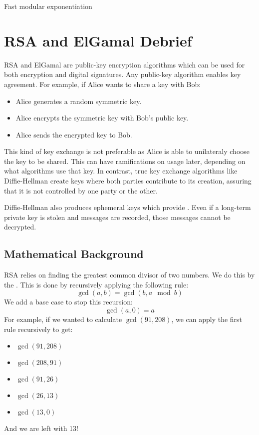 \begin{tecbox}{Fast modular exponentiation}{}
\end{tecbox}

\section{RSA and ElGamal Debrief}
RSA and ElGamal are public-key encryption algorithms which can be used for both encryption and digital signatures. Any public-key algorithm enables key agreement. For example, if Alice wants to share a key with Bob:
\begin{itemize}
    \item Alice generates a random symmetric key.
    \item Alice encrypts the symmetric key with Bob's public key.
    \item Alice sends the encrypted key to Bob.
\end{itemize}

This kind of key exchange is not preferable as Alice is able to unilateraly choose the key to be shared. This can have ramifications on usage later, depending on what algorithms use that key. In contrast, true key exchange algorithms like Diffie-Hellman create keys where both parties contribute to its creation, assuring that it is not controlled by one party or the other.

Diffie-Hellman also produces ephemeral keys which provide . Even if a long-term private key is stolen and messages are recorded, those messages cannot be decrypted.

\subsection{Mathematical Background}

RSA relies on finding the greatest common divisor of two numbers. We do this by the . This is done by recursively applying the following rule:
\[ \gcd(a,b) = \gcd(b, a \mod b) \]
We add a base case to stop this recursion:
\[ \gcd(a,0) = a \]
For example, if we wanted to calculate $\gcd(91, 208)$, we can apply the first rule recursively to get:
\begin{itemize}
    \item $\gcd(91, 208)$
    \item $\gcd(208,91)$
    \item $\gcd(91, 26)$
    \item $\gcd(26,13)$
    \item $\gcd(13,0)$
\end{itemize}
And we are left with 13!

